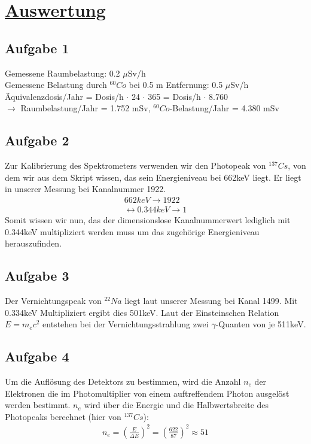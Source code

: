 \documentclass[11pt,a4paper]{article}
\begin{document}
\section{\underline{Auswertung}}
  \subsection{Aufgabe 1}
   Gemessene Raumbelastung: 0.2 $\mu$Sv/h \\
   Gemessene Belastung durch $^{60}{Co}$ bei 0.5 m Entfernung: 0.5 $\mu$Sv/h \\
   \"Aquivalenzdosis/Jahr = Dosis/h $\cdot$ 24 $\cdot$ 365 = Dosis/h $\cdot$ 8.760 \\
   $\rightarrow$ Raumbelastung/Jahr = 1.752 mSv, $^{60}{Co}$-Belastung/Jahr = 4.380 mSv \\
     \subsection{Aufgabe 2}
   Zur Kalibrierung des Spektrometers verwenden wir den Photopeak von $^{137}{Cs}$, von dem wir aus dem Skript wissen,
   das sein Energieniveau bei 662keV liegt. Er liegt in unserer Messung bei Kanalnummer 1922. 
    \begin{align}
     662keV \rightarrow 1922 \\
     \leftrightarrow 0.344keV \rightarrow 1
    \end{align}
   Somit wissen wir nun, das der dimensionslose Kanalnummerwert lediglich mit 0.344keV multipliziert werden muss um das zugeh\"orige Energieniveau
   herauszufinden.
  \subsection{Aufgabe 3}
   Der Vernichtungspeak von $^{22}{Na}$ liegt laut unserer Messung bei Kanal 1499. Mit 0.334keV Multipliziert ergibt dies 501keV. Laut der Einsteinschen Relation
   $E={m}_{e}c^2$ entstehen bei der Vernichtungsstrahlung zwei $\gamma$-Quanten von je 511keV. 
   \subsection{Aufgabe 4}
   Um die Aufl\"osung des Detektors zu bestimmen, wird die Anzahl ${n}_{e}$ der Elektronen die im
   Photomultiplier von einem auftreffendem Photon ausgel\"ost werden bestimmt. ${n}_{e}$ wird \"uber die 
   Energie und die Halbwertsbreite des Photopeaks berechnet (hier von $^{137}{Cs}$):
    \begin{align}
     {n}_{e} = {\left(\frac{E}{{\Delta}E}\right)}^{2} = {\left(\frac{622}{87}\right)}^{2} \approx
     51
    \end{align}
\end{document}

